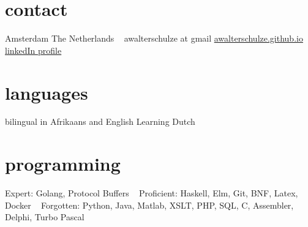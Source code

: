 \documentclass[print]{friggeri-cv} %
\begin{document}

\begin{aside} %
\section{contact}
Amsterdam
The Netherlands
~
awalterschulze at gmail
\href{http://awalterschulze.github.io}{awalterschulze.github.io}
\href{https://za.linkedin.com/in/schulzewalter}{linkedIn profile}
\section{languages}
bilingual in Afrikaans and English
Learning Dutch
\section{programming}
%
Expert: 
Golang, Protocol Buffers
~
Proficient: 
Haskell, Elm, Git, BNF, Latex, Docker
~
Forgotten:
Python, Java, Matlab, XSLT, PHP, SQL, C, Assembler, Delphi, Turbo Pascal
\end{aside}
\end{document}

